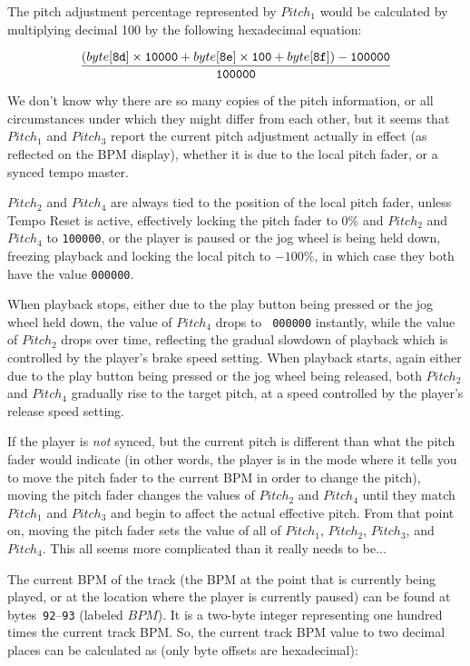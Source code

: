 \documentclass[11pt]{article}
\begin{document}
The pitch adjustment percentage represented by $Pitch_1$ would be
calculated by multiplying decimal 100 by the following hexadecimal
equation:

\begin{displaymath}
  \frac{(byte[{\tt 8d}] \times {\tt 10000} + byte[{\tt 8e}] \times
    {\tt 100} + byte[{\tt 8f}]) - {\tt 100000}}{{\tt 100000}}
\end{displaymath}

We don't know why there are so many copies of the pitch information,
or all circumstances under which they might differ from each other,
but it seems that $Pitch_1$ and $Pitch_3$ report the current pitch
adjustment actually in effect (as reflected on the BPM display),
whether it is due to the local pitch fader, or a synced tempo master.

$Pitch_2$ and $Pitch_4$ are always tied to the position of the local
pitch fader, unless Tempo Reset is active, effectively locking the
pitch fader to 0\% and $Pitch_2$ and $Pitch_4$ to {\tt 100000}, or
the player is paused or the jog wheel is being held down, freezing
playback and locking the local pitch to $-100\%$, in which case they
both have the value {\tt 000000}.

When playback stops, either due to the play button being pressed or
the jog wheel held down, the value of $Pitch_4$ drops to {\tt
  000000} instantly, while the value of $Pitch_2$ drops over time,
reflecting the gradual slowdown of playback which is controlled by the
player's brake speed setting. When playback starts, again either due
to the play button being pressed or the jog wheel being released, both
$Pitch_2$ and $Pitch_4$ gradually rise to the target pitch, at a speed
controlled by the player's release speed setting.

If the player is \emph{not} synced, but the current pitch is different
than what the pitch fader would indicate (in other words, the player
is in the mode where it tells you to move the pitch fader to the
current BPM in order to change the pitch), moving the pitch fader
changes the values of $Pitch_2$ and $Pitch_4$ until they match
$Pitch_1$ and $Pitch_3$ and begin to affect the actual effective
pitch. From that point on, moving the pitch fader sets the value of
all of $Pitch_1$, $Pitch_2$, $Pitch_3$, and $Pitch_4$. This all seems
more complicated than it really needs to be...

The current BPM of the track (the BPM at the point that is currently
being played, or at the location where the player is currently paused)
can be found at bytes~{\tt 92}--{\tt 93} (labeled $BPM$). It is a
two-byte integer representing one hundred times the current track BPM.
So, the current track BPM value to two decimal places can be
calculated as (only byte offsets are hexadecimal):
\end{document}
